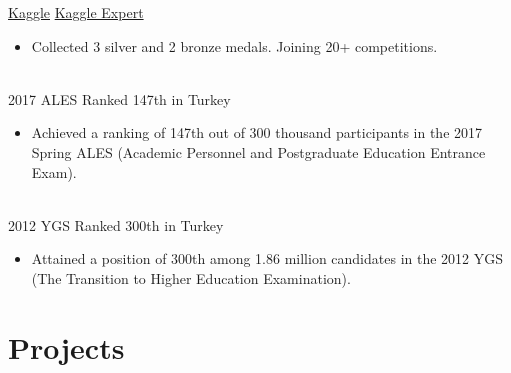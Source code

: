 \documentclass[letterpaper]{DS_class_file} %
\begin{document}
\begin{twenty} %
	\twentyitem
	{\href{https://www.kaggle.com}{Kaggle}}
	{}
	{\hspace{0.3cm}\href{https://www.kaggle.com/mbkinaci}{Kaggle Expert}}
	{}
	{}
	{
		{\begin{itemize}
				\item Collected 3 silver and 2 bronze medals. Joining 20+ competitions.
		\end{itemize}}
	}
	\\
	\twentyitem
	{2017 ALES}
	{}
	{\hspace{0.3cm}Ranked 147th in Turkey}
	{}
	{}
	{
		{\begin{itemize}
				\item Achieved a ranking of 147th out of 300 thousand participants in the 2017 Spring ALES (Academic Personnel and Postgraduate \newline Education Entrance Exam).
		\end{itemize}}
	}
	\\
	\twentyitem
	{2012 YGS}
	{}
	{\hspace{0.3cm}Ranked 300th in Turkey}
	{}
	{}
	{\begin{itemize}
			\item Attained a position of 300th among 1.86 million candidates in the 2012 YGS (The Transition to Higher Education Examination).    
   
	\end{itemize}}

\end{twenty}

\newpage

\makeseconda %

\section{Projects}
\end{document}
